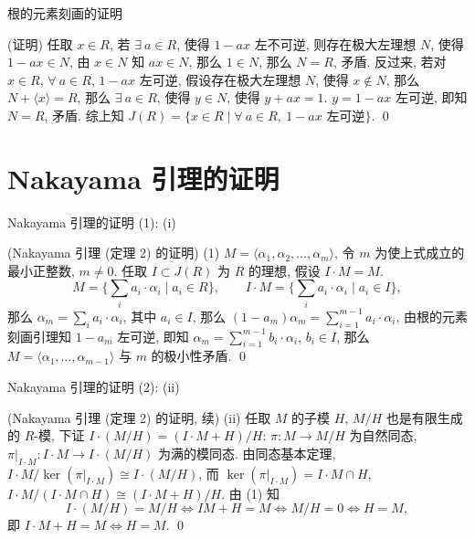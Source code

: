 
\begin{frame}{根的元素刻画的证明}

\startproof[bg=yellow, fg=red](证明)
任取 $x \in R$, 若 $\exists\ a \in R$, 使得 $1 - ax$ 左不可逆,
则存在极大左理想 $N$, 使得 $1 - ax \in N$, 由 $x \in N$ 知 $ax \in N$,
那么 $1 \in N$, 那么 $N = R$, 矛盾.
\pause
反过来, 若对 $x \in R$, $\forall\ a \in R$, $1 - ax$ 左可逆,
假设存在极大左理想 $N$, 使得 $x \notin N$, 那么 $N + \langle x \rangle = R$,
那么 $\exists\ a \in R$, 使得 $y \in N$, 使得 $y + ax = 1$.
$y = 1 - ax$ 左可逆, 即知 $N = R$, 矛盾.
综上知
$J(R) = \{ x \in R \mid \forall\ a \in R,\ 1 - ax \text{ 左可逆} \}$.
\qed

\end{frame}


\section[Nakayama 的证明]{Nakayama 引理的证明}


\begin{frame}{Nakayama 引理的证明 (1): (i)}

\startproof[bg=yellow, fg=red](Nakayama 引理 (定理 2) 的证明)
(1) $M = \langle \alpha_1, \alpha_2, \dots, \alpha_m \rangle$,
令 $m$ 为使上式成立的最小正整数, $m \neq 0$.
任取 $I \subset J(R)$ 为 $R$ 的理想, 假设 $I \cdot M = M$.
\[
M = \Big\{ \sum_i a_i \cdot \alpha_i \;\Big|\; a_i \in R \Big\},
\qquad
I \cdot M = \Big\{ \sum_i a_i \cdot \alpha_i \;\Big|\; a_i \in I \Big\},
\]
那么 $\alpha_m = \sum_i a_i \cdot \alpha_i$, 其中 $a_i \in I$,
那么 $(1 - a_m)\alpha_m = \sum_{i=1}^{m-1} a_i \cdot \alpha_i$,
由根的元素刻画引理知 $1 - a_m$ 左可逆,
\pause
即知 $\alpha_m = \sum_{i=1}^{m-1} b_i \cdot \alpha_i$, $b_i \in I$,
那么 $M = \langle \alpha_1, \dots, \alpha_{m-1} \rangle$ 与 $m$
的极小性矛盾.
\qed

\end{frame}


\begin{frame}{Nakayama 引理的证明 (2): (ii)}

\startproof[bg=yellow, fg=red](Nakayama 引理 (定理 2) 的证明, 续)
(ii) 任取 $M$ 的子模 $H$, $M/H$ 也是有限生成的 $R$-模,
下证 $I \cdot (M/H) = (I \cdot M + H)/H$:
$\pi: M \to M/H$ 为自然同态, $\pi|_{I \cdot M}: I \cdot M \to I \cdot (M/H)$
为满的模同态.
由同态基本定理,
$I \cdot M / \ker(\pi|_{I \cdot M}) \cong I \cdot (M/H)$,
而 $\ker(\pi|_{I \cdot M}) = I \cdot M \cap H$,
$I \cdot M / (I \cdot M \cap H) \cong (I \cdot M + H)/H$.
\pause
由 (1) 知
\[
I \cdot (M/H) = M/H \iff IM + H = M \iff M/H = 0
\iff H = M,
\]
即 $I \cdot M + H = M \iff H = M$.
\qed

\end{frame}

